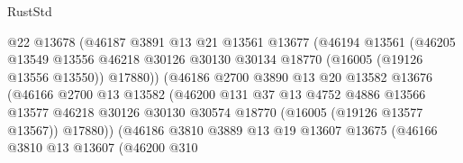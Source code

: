 \begin{lexlean}{RustStd}
\begin{coremodule}
                                @22
                                @13678
                                (@46187
                                  @3891
                                  @13
                                  @21
                                  @13561
                                  @13677
                                  (@46194
                                    @13561
                                    (@46205
                                      @13549
                                      @13556
                                      @46218
                                      @30126
                                      @30130
                                      @30134
                                      @18770
                                      (@16005 (@19126 @13556 @13550))
                                      @17880))
                                  (@46186
                                    @2700
                                    @3890
                                    @13
                                    @20
                                    @13582
                                    @13676
                                    (@46166
                                      @2700
                                      @13
                                      @13582
                                      (@46200
                                        @131
                                        @37
                                        @13
                                        @4752
                                        @4886
                                        @13566
                                        @13577
                                        @46218
                                        @30126
                                        @30130
                                        @30574
                                        @18770
                                        (@16005 (@19126 @13577 @13567))
                                        @17880))
                                    (@46186
                                      @3810
                                      @3889
                                      @13
                                      @19
                                      @13607
                                      @13675
                                      (@46166
                                        @3810
                                        @13
                                        @13607
                                        (@46200
                                          @310

\end{coremodule}
\end{lexlean}
